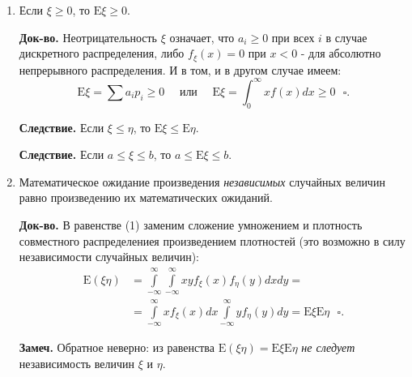 \documentclass[oneside,final,14pt]{extreport}
\newcommand\mynote{{\bf Замеч.}}
\newcommand\mycon{{\bf Следствие.}}
\newcommand\myqed{{\bf Док-во.}}
\theoremstyle{definition}
\begin{document}
\begin{enumerate}
    \myqed{} Воспользуемся равенством (1) и теоремой о совместном распределении:
    $$\begin{aligned}
    \mathrm{E}(\xi+\eta) &=\int\limits_{-\infty}^{\infty} \int\limits_{-\infty}^{\infty}(x+y) f(x, y) d x d y=\\
    &=\int\limits_{-\infty}^{\infty} x d x \int\limits_{-\infty}^{\infty} f(x, y) d y+\int\limits_{-\infty}^{\infty} y d y \int\limits_{-\infty}^{\infty} f(x, y) d x=\\
    &=\int\limits_{-\infty}^{\infty} x f_{\xi}(x) d x+\int\limits_{-\infty}^{\infty} y f_{\eta}(y) d y=\mathrm{E} \xi+\mathrm{E} \eta ~~~ \square.
    \end{aligned}$$
    \item Если $\xi \geq 0$, то $\mathrm{E}\xi \geq 0.$
    
    \myqed{} Неотрицательность $\xi$ означает, что $a_i \geq 0$ при всех $i$ в случае дискретного распределения, либо $f_\xi(x) = 0$ при $x < 0$ - для абсолютно непрерывного распределения. И в том, и в другом случае имеем:
    $$\mathrm{E} \xi=\sum a_{i} p_{i} \geqslant 0 \quad \text { или } \quad \mathrm{E} \xi=\int_{0}^{\infty} x f(x) d x \geqslant 0 ~~~ \square.$$
    
    \mycon{} Если $\xi \leq \eta$, то $\mathrm{E}\xi \leq \mathrm{E}\eta.$
    
    \mycon{} Если $a \leq \xi \leq b$, то $a \leq \mathrm{E}\xi \leq b$.
    
    \item Математическое ожидание произведения {\it независимых} случайных величин равно произведению их математических ожиданий.
    
    \myqed{} В равенстве (1) заменим сложение умножением и плотность совместного распределениея произведением плотностей (это возможно в силу независимости случайных величин):
    $$\begin{aligned}
    \mathrm{E}(\xi \eta) &=\int\limits_{-\infty}^{\infty} \int\limits_{-\infty}^{\infty} x y f_{\xi}(x) f_{\eta}(y) d x d y=\\
    &=\int\limits_{-\infty}^{\infty} x f_{\xi}(x) d x \int\limits_{-\infty}^{\infty} y f_{\eta}(y) d y=\mathrm{E} \xi \mathrm{E} \eta ~~~ \square.
    \end{aligned}$$
    
    \mynote{} Обратное неверно: из равенства $\mathrm{E}(\xi \eta) = \mathrm{E}\xi \mathrm{E} \eta$ {\it не следует} независимость величин $\xi$ и $\eta$.
\end{enumerate}
\end{document}
